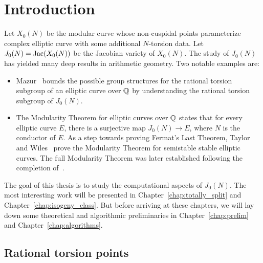 \chapter{Introduction}%
\label{chap:intro}

Let $X_0(N)$ be the modular curve whose non-cuspidal points parameterize
complex elliptic curve with some additional $N$-torsion data. Let
$J_0(N)=\operatorname{Jac}(X_0(N))$ be the Jacobian variety of $X_0(N)$. The study of
$J_0(N)$ has yielded many deep results in arithmetic geometry. Two notable
examples are:
\begin{itemize}
    \item 
        Mazur~\cite{mazur:eisenstein} bounds the possible group structures for
        the rational torsion subgroup of an elliptic curve over $\mathbb{Q}$ by
        understanding the rational torsion subgroup of $J_0(N)$.
    \item
        The Modularity Theorem for elliptic curves over $\mathbb{Q}$ states that for
        every elliptic curve $E$, there is a surjective map $J_0(N)\to E$,
        where $N$ is the conductor of $E$. As a step towards proving Fermat's
        Last Theorem, Taylor and
        Wiles~\cite{wiles:fermat}\cite{taylor-wiles:fermat} prove the
        Modularity Theorem for semistable stable elliptic curves. The full
        Modularity Theorem was later established following the completion
        of~\cite{breuil-conrad-diamond-taylor}.
\end{itemize}

The goal of this thesis is to study the computational aspects of $J_0(N)$. The
most interesting work will be presented in Chapter~\ref{chap:totally_split} and
Chapter~\ref{chap:isogeny_class}. But before arriving at these chapters, we
will lay down some theoretical and algorithmic preliminaries in
Chapter~\ref{chap:prelim} and Chapter~\ref{chap:algorithms}.

\section{Rational torsion points}%
\label{sec:rational_torsion_points}

